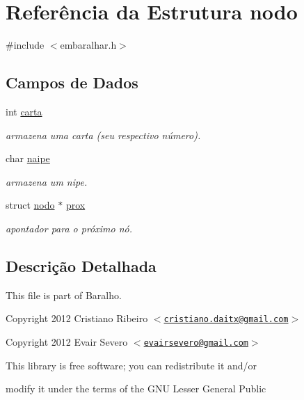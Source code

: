 \hypertarget{structnodo}{
\section{Referência da Estrutura nodo}
\label{structnodo}
}


{\ttfamily \#include $<$embaralhar.h$>$}

\subsection*{Campos de Dados}
\begin{DoxyCompactItemize}
\item 
int \hyperlink{structnodo_a0d153279003388933e082f40da4a3702}{carta}
\begin{DoxyCompactList}\small\item\em armazena uma carta (seu respectivo número). \item\end{DoxyCompactList}\item 
char \hyperlink{structnodo_aba763958bee1abb2961d0d2e82f8cdfb}{naipe}
\begin{DoxyCompactList}\small\item\em armazena um nipe. \item\end{DoxyCompactList}\item 
struct \hyperlink{structnodo}{nodo} $\ast$ \hyperlink{structnodo_a486ad5c9b955ff42eaf8fbf3330e4c75}{prox}
\begin{DoxyCompactList}\small\item\em apontador para o próximo nó. \item\end{DoxyCompactList}\end{DoxyCompactItemize}


\subsection{Descrição Detalhada}
This file is part of Baralho.

Copyright 2012 Cristiano Ribeiro $<$\href{mailto:cristiano.daitx@gmail.com}{\tt cristiano.daitx@gmail.com}$>$

Copyright 2012 Evair Severo $<$\href{mailto:evairsevero@gmail.com}{\tt evairsevero@gmail.com}$>$

This library is free software; you can redistribute it and/or

modify it under the terms of the GNU Lesser General Public

